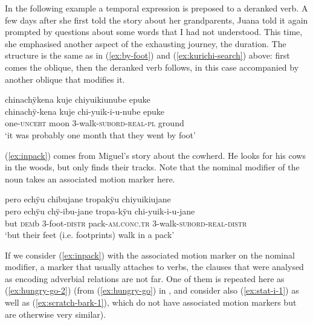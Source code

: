 In the following example a temporal expression is preposed to a deranked verb. A few days after she first told the story about her grandparents, Juana told it again prompted by questions about some words that I had not understood. This time, she emphasised another aspect of the exhausting journey, the duration. The structure is the same as in (\ref{ex:by-foot}) and (\ref{ex:kurichi-search}) above: first comes the oblique, then the deranked verb follows, in this case accompanied by another oblique that modifies it.

\ea\label{ex:SUBORD-INTRO}
\begingl 
\glpreamble chinachÿkena kuje chiyuikiunube epuke\\
\gla chinachÿ-kena kuje chi-yuik-i-u-nube epuke\\ 
\glb one-\textsc{uncert} moon 3-walk-\textsc{subord}-\textsc{real}-\textsc{pl} ground\\ 
\glft ‘it was probably one month that they went by foot’\\ 
\endgl
\trailingcitation{[jxx-e150925l-1.196]}
\xe


(\ref{ex:inpack}) comes from Miguel’s story about the cowherd. He looks for his cows in the woods, but only finds their tracks. Note that the nominal modifier of the noun takes an associated motion marker here.

\ea\label{ex:inpack}
\begingl
\glpreamble pero echÿu chibujane tropakÿu chiyuikiujane \\
\gla pero echÿu chÿ-ibu-jane tropa-kÿu chi-yuik-i-u-jane \\ 
\glb but \textsc{dem}b 3-foot-\textsc{distr} pack-\textsc{am.conc.tr} 3-walk-\textsc{subord}-\textsc{real}-\textsc{distr} \\ 
\glft ‘but their feet (i.e. footprints) walk in a pack’\\ 
\endgl
\trailingcitation{[mxx-n151017l-1.19]}
\xe

If we consider (\ref{ex:inpack}) with the associated motion marker on the nominal modifier, a marker that usually attaches to verbs, the clauses that were analysed as encoding adverbial relations are not far. One of them is repeated here as  (\ref{ex:hungry-go-2}) (from (\ref{ex:hungry-go}) in , and consider also (\ref{ex:stat-i-1}) as well as (\ref{ex:scratch-bark-1}), which do not have associated motion markers but are otherwise very similar).



